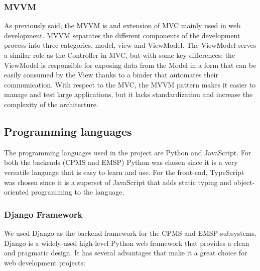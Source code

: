 \documentclass[table, 12pt]{article}
\begin{document}
\subsubsection*{MVVM}
As previously said, the MVVM is and extension of MVC mainly used in web development.
MVVM separates the different components of the development process into three categories, model, view and ViewModel.
The ViewModel serves a similar role as the Controller in MVC, but with some key differences: the ViewModel is responsible for exposing data from the Model in a form that can be easily consumed by the View thanks to a binder that automates their communication.
With respect to the MVC, the MVVM pattern makes it easier to manage and test large applications, but it lacks standardization and increase the complexity of the architecture.

\subsection{Programming languages}
The programming languages used in the project are Python and JavaScript. For both the backends (CPMS and EMSP) Python was chosen since it is a very versatile language that is easy to learn and use.
For the front-end, TypeScript was chosen since it is a superset of JavaScript that adds static typing and object-oriented programming to the language. 

\subsubsection{Django Framework}
We used Django as the backend framework for the CPMS and EMSP subsystems.
Django is a widely-used high-level Python web framework that provides a clean and pragmatic design. It has several advantages that make it a great choice for web development projects:
\end{document}
